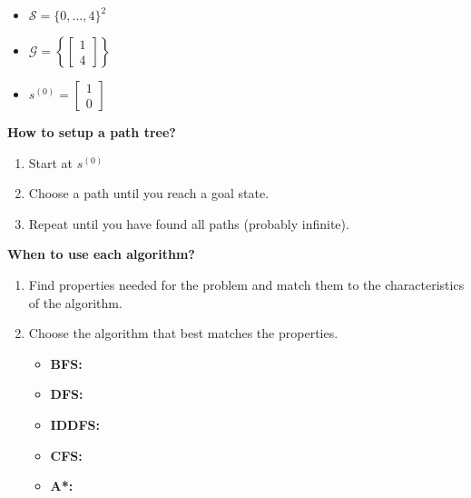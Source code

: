 \begin{example}
    \begin{itemize}
        \item $\mathcal{S} = \{0,\ldots,4 \}^2$
        \item $\mathcal{G} = \left\{ \begin{bmatrix}
            1 \\
            4
        \end{bmatrix} \right\}$
        \item $s^{(0)} = \begin{bmatrix}
            1 \\
            0
        \end{bmatrix}$
    \end{itemize}
\end{example}
\newpage


\begin{process} \textbf{How to setup a path tree?}
    \begin{enumerate}
        \item Start at $s^{(0)}$
        \item Choose a path until you reach a goal state.
        \item Repeat until you have found all paths (probably infinite).
    \end{enumerate}
\end{process}

\begin{example}
\end{example}

\newpage

\begin{process} \textbf{When to use each algorithm?}
    \begin{enumerate}
        \item Find properties needed for the problem and match them to the characteristics of the algorithm.
        \item Choose the algorithm that best matches the properties.
        \begin{itemize}
            \item \textbf{BFS:} 
            \item \textbf{DFS:} 
            \item \textbf{IDDFS:} 
            \item \textbf{CFS:}
            \item \textbf{A*:} 
        \end{itemize}
    \end{enumerate}
\end{process}

